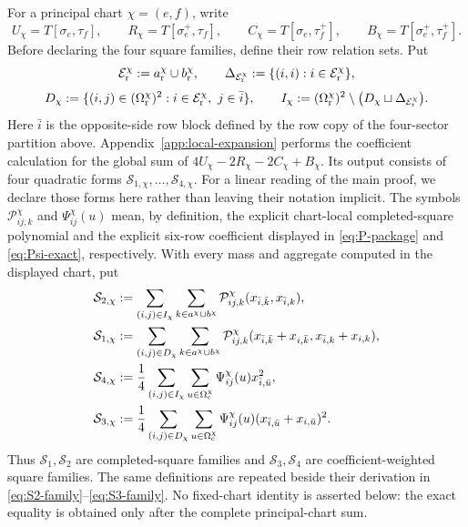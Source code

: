 \documentclass[11pt]{article}
\begin{document}
For a principal chart $\chi=(e,f)$, write
\[
 U_\chi=T[\sigma_e,\tau_f],\qquad
 R_\chi=T[\sigma_e^+,\tau_f],\qquad
 C_\chi=T[\sigma_e,\tau_f^+],\qquad
 B_\chi=T[\sigma_e^+,\tau_f^+].
\]
Before declaring the four square families, define their row relation sets.
Put
\[
\mathcal E_{\rm r}^\chi:=a_{\rm r}^\chi\cup b_{\rm r}^\chi,\qquad
\Delta_{\mathcal E_{\rm r}^\chi}
:=\{(i,i):i\in\mathcal E_{\rm r}^\chi\},
\]
\[
D_\chi
:=\{(i,j)\in(\Omega_{\rm r}^\chi)^2:
       i\in\mathcal E_{\rm r}^\chi,\ j\in\bar i\},
\qquad
I_\chi
:=(\Omega_{\rm r}^\chi)^2
\setminus\bigl(D_\chi\sqcup\Delta_{\mathcal E_{\rm r}^\chi}\bigr).
\]
Here $\bar i$ is the opposite-side row block defined by the row copy of the
four-sector partition above.
Appendix~\ref{app:local-expansion} performs the coefficient calculation for
the global sum of $4U_\chi-2R_\chi-2C_\chi+B_\chi$.  Its output consists of
four quadratic forms $\mathcal S_{1,\chi},\ldots,\mathcal S_{4,\chi}$.
For a linear reading of the main proof, we declare those forms here rather
than leaving their notation implicit.  The symbols
$\mathcal P_{ij,k}^{\chi}$ and $\Psi_{ij}^{\chi}(u)$ mean, by definition,
the explicit chart-local completed-square polynomial and the explicit
six-row coefficient displayed in \eqref{eq:P-package} and
\eqref{eq:Psi-exact}, respectively.  With every mass and aggregate computed
in the displayed chart, put
\[
\begin{aligned}
\mathcal S_{2,\chi}
&:=\sum_{(i,j)\in I_\chi}\sum_{k\in a^\chi\cup b^\chi}
 \mathcal P_{ij,k}^{\chi}(x_{\bar i,\bar k},x_{\bar i,k}),\\
\mathcal S_{1,\chi}
&:=\sum_{(i,j)\in D_\chi}\sum_{k\in a^\chi\cup b^\chi}
 \mathcal P_{ij,k}^{\chi}
 (x_{\bar i,\bar k}+x_{i,\bar k},x_{\bar i,k}+x_{i,k}),\\
\mathcal S_{4,\chi}
&:=\frac14\sum_{(i,j)\in I_\chi}
 \sum_{u\in\Omega_{\rm c}^\chi}
 \Psi_{ij}^{\chi}(u)x_{\bar i,\bar u}^{2},\\
\mathcal S_{3,\chi}
&:=\frac14\sum_{(i,j)\in D_\chi}
 \sum_{u\in\Omega_{\rm c}^\chi}
 \Psi_{ij}^{\chi}(u)(x_{\bar i,\bar u}+x_{i,\bar u})^{2}.
\end{aligned}
\]
Thus $\mathcal S_1,\mathcal S_2$ are completed-square families and
$\mathcal S_3,\mathcal S_4$ are coefficient-weighted square families.  The
same definitions are repeated beside their derivation in
\eqref{eq:S2-family}--\eqref{eq:S3-family}.  No fixed-chart identity is
asserted below: the exact equality is obtained only after the complete
principal-chart sum.
\end{document}
